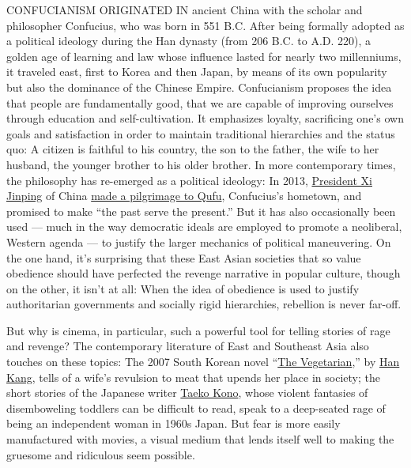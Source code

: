 CONFUCIANISM ORIGINATED IN ancient China with the scholar and
philosopher Confucius, who was born in 551 B.C. After being formally
adopted as a political ideology during the Han dynasty (from 206 B.C. to
A.D. 220), a golden age of learning and law whose influence lasted for
nearly two millenniums, it traveled east, first to Korea and then Japan,
by means of its own popularity but also the dominance of the Chinese
Empire. Confucianism proposes the idea that people are fundamentally
good, that we are capable of improving ourselves through education and
self-cultivation. It emphasizes loyalty, sacrificing one's own goals and
satisfaction in order to maintain traditional hierarchies and the status
quo: A citizen is faithful to his country, the son to the father, the
wife to her husband, the younger brother to his older brother. In more
contemporary times, the philosophy has re-emerged as a political
ideology: In 2013,
\href{https://www.nytimes3xbfgragh.onion/topic/person/xi-jinping}{President
Xi Jinping} of China
\href{https://sinosphere.blogs.nytimes3xbfgragh.onion/2013/11/26/xi-pays-homage-to-confucius-a-figure-back-in-favor/}{made
a pilgrimage to Qufu}, Confucius's hometown, and promised to make ``the
past serve the present.'' But it has also occasionally been used ---
much in the way democratic ideals are employed to promote a neoliberal,
Western agenda --- to justify the larger mechanics of political
maneuvering. On the one hand, it's surprising that these East Asian
societies that so value obedience should have perfected the revenge
narrative in popular culture, though on the other, it isn't at all: When
the idea of obedience is used to justify authoritarian governments and
socially rigid hierarchies, rebellion is never far-off.

But why is cinema, in particular, such a powerful tool for telling
stories of rage and revenge? The contemporary literature of East and
Southeast Asia also touches on these topics: The 2007 South Korean novel
``\href{https://www.nytimes3xbfgragh.onion/2016/02/03/books/the-vegetarian-a-surreal-south-korean-novel.html}{The
Vegetarian},'' by
\href{https://www.nytimes3xbfgragh.onion/2016/05/18/books/han-kang-wins-man-booker-international-prize-for-fiction-with-the-vegetarian.html}{Han
Kang}, tells of a wife's revulsion to meat that upends her place in
society; the short stories of the Japanese writer
\href{https://www.nytimes3xbfgragh.onion/2018/10/30/t-magazine/japanese-stories-books.html}{Taeko
Kono}, whose violent fantasies of disemboweling toddlers can be
difficult to read, speak to a deep-seated rage of being an independent
woman in 1960s Japan. But fear is more easily manufactured with movies,
a visual medium that lends itself well to making the gruesome and
ridiculous seem possible.

